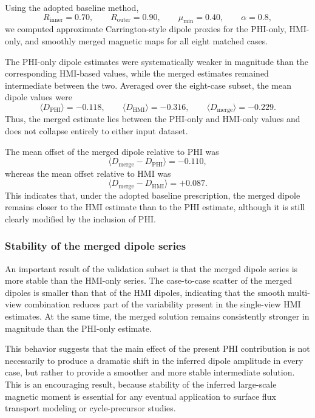 \documentclass[namedreferences,hyperref,optionalrh]{spr-sola}
\begin{document}
Using the adopted baseline method,
\begin{equation}
    R_{\mathrm{inner}}=0.70,\qquad
    R_{\mathrm{outer}}=0.90,\qquad
    \mu_{\min}=0.40,\qquad
    \alpha=0.8,
\end{equation}
we computed approximate Carrington-style dipole proxies for the PHI-only, HMI-only, and smoothly merged magnetic maps for all eight matched cases.

The PHI-only dipole estimates were systematically weaker in magnitude than the corresponding HMI-based values, while the merged estimates remained intermediate between the two. Averaged over the eight-case subset, the mean dipole values were
\begin{equation}
    \langle D_{\mathrm{PHI}} \rangle = -0.118,
    \qquad
    \langle D_{\mathrm{HMI}} \rangle = -0.316,
    \qquad
    \langle D_{\mathrm{merge}} \rangle = -0.229.
\end{equation}
Thus, the merged estimate lies between the PHI-only and HMI-only values and does not collapse entirely to either input dataset.

The mean offset of the merged dipole relative to PHI was
\begin{equation}
    \langle D_{\mathrm{merge}} - D_{\mathrm{PHI}} \rangle = -0.110,
\end{equation}
whereas the mean offset relative to HMI was
\begin{equation}
    \langle D_{\mathrm{merge}} - D_{\mathrm{HMI}} \rangle = +0.087.
\end{equation}
This indicates that, under the adopted baseline prescription, the merged dipole remains closer to the HMI estimate than to the PHI estimate, although it is still clearly modified by the inclusion of PHI.

\subsubsection{Stability of the merged dipole series}

An important result of the validation subset is that the merged dipole series is more stable than the HMI-only series. The case-to-case scatter of the merged dipoles is smaller than that of the HMI dipoles, indicating that the smooth multi-view combination reduces part of the variability present in the single-view HMI estimates. At the same time, the merged solution remains consistently stronger in magnitude than the PHI-only estimate.

This behavior suggests that the main effect of the present PHI contribution is not necessarily to produce a dramatic shift in the inferred dipole amplitude in every case, but rather to provide a smoother and more stable intermediate solution. This is an encouraging result, because stability of the inferred large-scale magnetic moment is essential for any eventual application to surface flux transport modeling or cycle-precursor studies.
\end{document}
